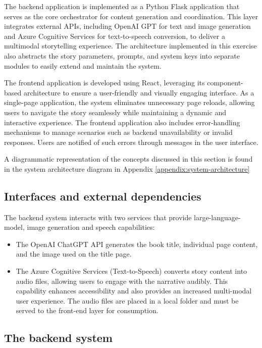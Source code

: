 \documentclass[conference]{IEEEtran}
\begin{document}
	The backend application is implemented as a Python Flask application that serves as the core orchestrator for content generation and coordination. This layer integrates external APIs, including OpenAI GPT for text and image generation and Azure Cognitive Services for text-to-speech conversion, to deliver a multimodal storytelling experience. The architecture implemented in this exercise also abstracts the story parameters, prompts, and system keys into separate modules to easily extend and maintain the system.
	
	The frontend application is developed using React, leveraging its component-based architecture to ensure a user-friendly and visually engaging interface. As a single-page application, the system eliminates unnecessary page reloads, allowing users to navigate the story seamlessly while maintaining a dynamic and interactive experience. The frontend application also includes error-handling mechanisms to manage scenarios such as backend unavailability or invalid responses. Users are notified of such errors through messages in the user interface.
	
	A diagrammatic representation of the concepts discussed in this section is found in the system architecture diagram in Appendix \ref{appendix:system-architecture}
	
	\subsection{Interfaces and external dependencies}
	
	The backend system interacts with two services that provide large-language-model, image generation and speech capabilities:
	
	\begin{itemize}
		\item The OpenAI ChatGPT API generates the book title, individual page content, and the image used on the title page.
		\item The Azure Cognitive Services (Text-to-Speech) converts story content into audio files, allowing users to engage with the narrative audibly. This capability enhances accessibility and also provides an increased multi-modal user experience. The audio files are placed in a local folder and must be served to the front-end layer for consumption.
	\end{itemize}
	
	\subsection{The backend system}
	
\end{document}

